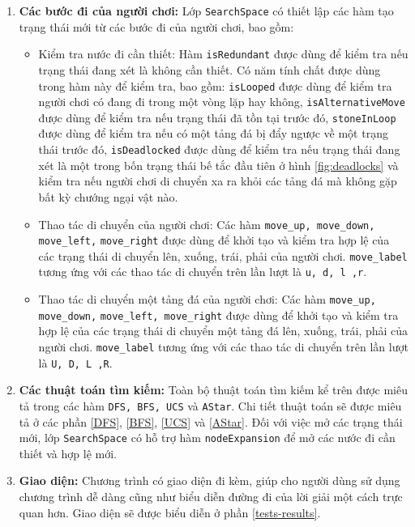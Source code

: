 \begin{enumerate}[label=\bfseries\arabic*), labelindent=2em, labelsep=0.3cm, leftmargin=1cm, wide=\parindent, topsep=0.1cm, itemsep=-1ex, partopsep=1.5ex, parsep=1.5ex]
\begin{itemize}[labelindent=2em, labelsep=0.3cm, leftmargin=1cm, wide=1.5\parindent, topsep=0.1cm, itemsep=-1ex, partopsep=1.5ex, parsep=1.5ex]
	\end{itemize}
	\item \textbf{Các bước đi của người chơi:} Lớp \verb|SearchSpace| có thiết lập các hàm tạo trạng thái mới từ các bước đi của người chơi, bao gồm:
	\begin{itemize}[labelindent=2em, labelsep=0.3cm, leftmargin=1cm, wide=1.5\parindent, topsep=0.1cm, itemsep=-1ex, partopsep=1.5ex, parsep=1.5ex]
		\item Kiểm tra nước đi cần thiết: Hàm \verb|isRedundant| được dùng để kiểm tra nếu trạng thái đang xét là không cần thiết. Có năm tính chất được dùng trong hàm này để kiểm tra, bao gồm: \verb|isLooped| được dùng để kiểm tra người chơi có đang đi trong một vòng lặp hay không, \verb|isAlternativeMove| được dùng để kiểm tra nếu trạng thái đã tồn tại trước đó, \verb|stoneInLoop| được dùng để kiểm tra nếu có một tảng đá bị đẩy ngược về một trạng thái trước đó, \verb|isDeadlocked| được dùng để kiểm tra nếu trạng thái đang xét là một trong bốn trạng thái bế tắc đầu tiên ở hình \ref{fig:deadlocks} và kiểm tra nếu người chơi di chuyển xa ra khỏi các tảng đá mà không gặp bất kỳ chướng ngại vật nào.
		\item Thao tác di chuyển của người chơi: Các hàm \verb|move_up, move_down, move_left,| \verb|move_right| được dùng để khởi tạo và kiểm tra hợp lệ của các trạng thái di chuyển lên, xuống, trái, phải của người chơi. \verb|move_label| tương ứng với các thao tác di chuyển trên lần lượt là \verb|u, d, l ,r|.
		\item Thao tác di chuyển một tảng đá của người chơi: Các hàm \verb|move_up, move_down,| \verb|move_left, move_right| được dùng để khởi tạo và kiểm tra hợp lệ của các trạng thái di chuyển một tảng đá lên, xuống, trái, phải của người chơi. \verb|move_label| tương ứng với các thao tác di chuyển trên lần lượt là \verb|U, D, L ,R|.
	\end{itemize}
	\item \textbf{Các thuật toán tìm kiếm:} Toàn bộ thuật toán tìm kiếm kể trên được miêu tả trong các hàm \verb|DFS, BFS, UCS| và \verb|AStar|. Chi tiết thuật toán sẽ được miêu tả ở các phần \ref{DFS}, \ref{BFS}, \ref{UCS} và \ref{AStar}. Đối với việc mở các trạng thái mới, lớp \verb|SearchSpace| có hỗ trợ hàm \verb|nodeExpansion| để mở các nước đi cần thiết và hợp lệ mới.
	\item \textbf{Giao diện:} Chương trình có giao diện đi kèm, giúp cho người dùng sử dụng chương trình dễ dàng cũng như biểu diễn đường đi của lời giải một cách trực quan hơn. Giao diện sẽ được biểu diễn ở phần \ref{tests-results}.
\end{enumerate}
\newpage
